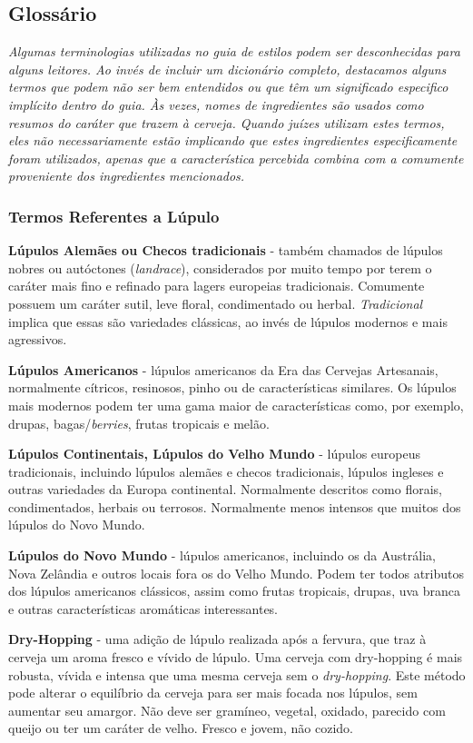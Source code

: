 \subsection*{Glossário}
\textit{Algumas terminologias utilizadas no guia de estilos podem ser desconhecidas para alguns leitores. Ao invés de incluir um dicionário completo, destacamos alguns termos que podem não ser bem entendidos ou que têm um significado especifico implícito dentro do guia. Às vezes, nomes de ingredientes são usados como resumos do caráter que trazem à cerveja. Quando juízes utilizam estes termos, eles não necessariamente estão implicando que estes ingredientes especificamente foram utilizados, apenas que a característica percebida combina com a comumente proveniente dos ingredientes mencionados.}
\subsubsection*{Termos Referentes a Lúpulo}
\textbf{Lúpulos Alemães ou Checos tradicionais} - também chamados de lúpulos nobres ou autóctones (\textit{landrace}), considerados por muito tempo por terem o caráter mais fino e refinado para lagers europeias tradicionais. Comumente possuem um caráter sutil, leve floral, condimentado ou herbal. \textit{Tradicional} implica que essas são variedades clássicas, ao invés de lúpulos modernos e mais agressivos.

\textbf{Lúpulos Americanos} - lúpulos americanos da Era das Cervejas Artesanais, normalmente cítricos, resinosos, pinho ou de características similares. Os lúpulos mais modernos podem ter uma gama maior de características como, por exemplo, drupas, bagas/\textit{berries}, frutas tropicais e melão.

\textbf{Lúpulos Continentais, Lúpulos do Velho Mundo} - lúpulos europeus tradicionais, incluindo lúpulos alemães e checos tradicionais, lúpulos ingleses e outras variedades da Europa continental. Normalmente descritos como florais, condimentados, herbais ou terrosos. Normalmente menos intensos que muitos dos lúpulos do Novo Mundo.

\textbf{Lúpulos do Novo Mundo} - lúpulos americanos, incluindo os da Austrália, Nova Zelândia e outros locais fora os do Velho Mundo. Podem ter todos atributos dos lúpulos americanos clássicos, assim como frutas tropicais, drupas, uva branca e outras características aromáticas interessantes.

\textbf{Dry-Hopping} - uma adição de lúpulo realizada após a fervura, que traz à cerveja um aroma fresco e vívido de lúpulo. Uma cerveja com dry-hopping é mais robusta, vívida e intensa que uma mesma cerveja sem o \textit{dry-hopping}. Este método pode alterar o equilíbrio da cerveja para ser mais focada nos lúpulos, sem aumentar seu amargor. Não deve ser gramíneo, vegetal, oxidado, parecido com queijo ou ter um caráter de velho. Fresco e jovem, não cozido.

